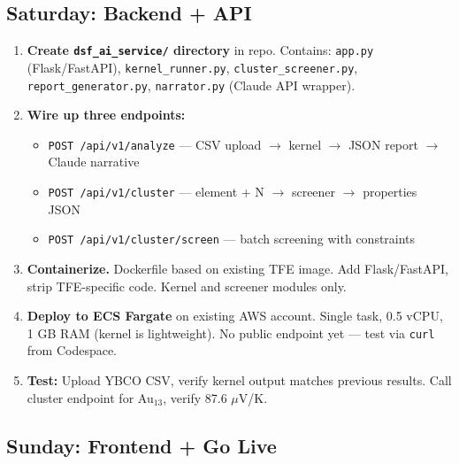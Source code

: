 \documentclass[11pt,letterpaper]{article}
\begin{document}
\subsection{Saturday: Backend + API}

\begin{enumerate}
  \item \textbf{Create \texttt{dsf\_ai\_service/} directory} in repo.
    Contains: \texttt{app.py} (Flask/FastAPI), \texttt{kernel\_runner.py},
    \texttt{cluster\_screener.py}, \texttt{report\_generator.py},
    \texttt{narrator.py} (Claude API wrapper).

  \item \textbf{Wire up three endpoints:}
    \begin{itemize}
      \item \texttt{POST /api/v1/analyze} --- CSV upload $\to$ kernel
        $\to$ JSON report $\to$ Claude narrative
      \item \texttt{POST /api/v1/cluster} --- element + N $\to$
        screener $\to$ properties JSON
      \item \texttt{POST /api/v1/cluster/screen} --- batch screening
        with constraints
    \end{itemize}

  \item \textbf{Containerize.} Dockerfile based on existing TFE image.
    Add Flask/FastAPI, strip TFE-specific code. Kernel and screener
    modules only.

  \item \textbf{Deploy to ECS Fargate} on existing AWS account.
    Single task, 0.5 vCPU, 1 GB RAM (kernel is lightweight). No
    public endpoint yet --- test via \texttt{curl} from Codespace.

  \item \textbf{Test:} Upload YBCO CSV, verify kernel output matches
    previous results. Call cluster endpoint for Au$_{13}$, verify
    87.6 $\mu$V/K.
\end{enumerate}

\subsection{Sunday: Frontend + Go Live}
\end{document}
